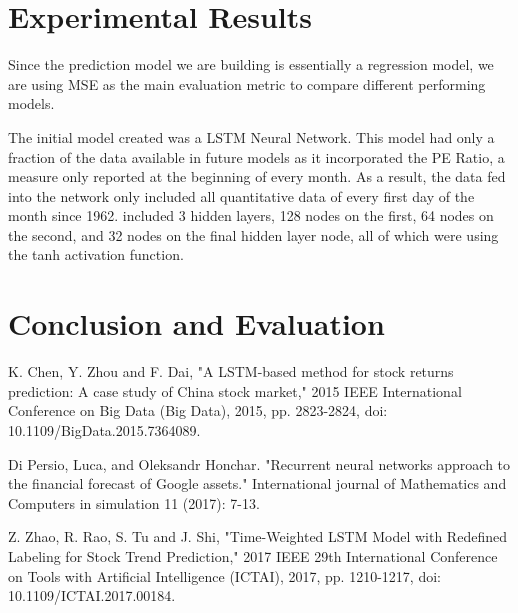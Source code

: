 \documentclass{article}
\begin{document}
\section{Experimental Results} 

Since the prediction model we are building is essentially a regression model, we are using MSE as the main evaluation metric to compare different performing models. 

The initial model created was a LSTM Neural Network. This model had only a fraction of the data available in future models as it incorporated the PE Ratio, a measure only reported at the beginning of every month. As a result, the data fed into the network only included all quantitative data of every first day of the month since 1962. included 3 hidden layers, 128 nodes on the first, 64 nodes on the second, and 32 nodes on the final hidden layer node, all of which were using the tanh activation function.


\section{Conclusion and Evaluation} 

\begin{thebibliography}{9}
K. Chen, Y. Zhou and F. Dai, "A LSTM-based method for stock returns prediction: A case study of China stock market," 2015 IEEE International Conference on Big Data (Big Data), 2015, pp. 2823-2824, doi: 10.1109/BigData.2015.7364089.

Di Persio, Luca, and Oleksandr Honchar. "Recurrent neural networks approach to the financial forecast of Google assets." International journal of Mathematics and Computers in simulation 11 (2017): 7-13.

Z. Zhao, R. Rao, S. Tu and J. Shi, "Time-Weighted LSTM Model with Redefined Labeling for Stock Trend Prediction," 2017 IEEE 29th International Conference on Tools with Artificial Intelligence (ICTAI), 2017, pp. 1210-1217, doi: 10.1109/ICTAI.2017.00184.

\end{thebibliography}
\end{document}

